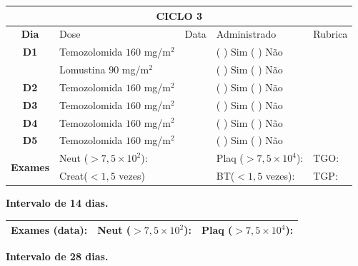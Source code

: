 \documentclass[11pt,a4paper,oldfontcommands]{memoir}
\begin{document}
\begin{center}
\begin{longtable}{p{1cm}p{4cm}|p{1cm}|p{4.6cm}|p{3cm}}
	\hline
	\multicolumn{5}{c}{\textbf{CICLO 3}}\\
\hline
    \multicolumn{1}{c|}{\multirow{1}{*}{\textbf{Dia}}}&{Dose}&{Data}&{Administrado}&{Rubrica} \\
    \hline
    \multicolumn{1}{c|}{\multirow{1}{*}{\textbf{D1}}}&{Temozolomida \(160\) mg/m\(^2\)}&&{(  ) Sim (  ) Não}&\\
    \multicolumn{1}{c|}{\multirow{1}{*}{\textbf{}}}&{Lomustina \(90\) mg/m\(^2\)}&&{(  ) Sim (  ) Não}&\\
    \multicolumn{1}{c|}{\multirow{1}{*}{\textbf{D2}}}&{Temozolomida \(160\) mg/m\(^2\)}&&{(  ) Sim (  ) Não}&\\
    \multicolumn{1}{c|}{\multirow{1}{*}{\textbf{D3}}}&{Temozolomida \(160\) mg/m\(^2\)}&&{(  ) Sim (  ) Não}&\\
    \multicolumn{1}{c|}{\multirow{1}{*}{\textbf{D4}}}&{Temozolomida \(160\) mg/m\(^2\)}&&{(  ) Sim (  ) Não}&\\
    \multicolumn{1}{c|}{\multirow{1}{*}{\textbf{D5}}}&{Temozolomida \(160\) mg/m\(^2\)}&&{(  ) Sim (  ) Não}&\\
    \hline
    \multicolumn{1}{c|}{\multirow{2}{*}{\textbf{Exames}}}&\multicolumn{2}{l|}{Neut (\(>7,5\times10^2\)):}&{Plaq (\(>7,5\times10^4\)):}&{TGO:}\\
    \cline{2-5}
    \multicolumn{1}{c|}{\multirow{2}{*}{{}}}&\multicolumn{2}{l|}{Creat(\(<1,5\) vezes)}&{BT(\(<1,5\) vezes):}&{TGP:}
    \\
    \hline
\end{longtable}
\textbf{Intervalo de 14 dias.}
\begin{longtable}{p{5cm}|p{5cm}|p{4.5cm}}
    \hline
    \textbf{Exames (data):}&{Neut (\(>7,5\times10^2\)):}&{Plaq (\(>7,5\times10^4\)):}
    \\
    \hline
\end{longtable}
\textbf{Intervalo de 28 dias.}
\\[1.5cm]
\end{center}
\end{document}
